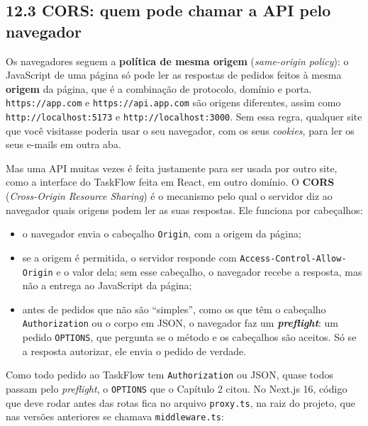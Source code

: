 \subsection{12.3 CORS: quem pode chamar a API pelo navegador}

Os navegadores seguem a \textbf{política de mesma origem} (\textit{same-origin policy}): o JavaScript de uma página só pode ler as respostas de pedidos feitos à mesma \textbf{origem} da página, que é a combinação de protocolo, domínio e porta. \texttt{https://app.com} e \texttt{https://api.app.com} são origens diferentes, assim como \texttt{http://localhost:5173} e \texttt{http://localhost:3000}. Sem essa regra, qualquer site que você visitasse poderia usar o seu navegador, com os seus \textit{cookies}, para ler os seus e-mails em outra aba.

Mas uma API muitas vezes é feita justamente para ser usada por outro site, como a interface do TaskFlow feita em React, em outro domínio. O \textbf{CORS} (\textit{Cross-Origin Resource Sharing}) é o mecanismo pelo qual o servidor diz ao navegador quais origens podem ler as suas respostas. Ele funciona por cabeçalhos:

\begin{itemize}
  \item o navegador envia o cabeçalho \texttt{Origin}, com a origem da página;
  \item se a origem é permitida, o servidor responde com \texttt{Access-Control-Allow-Origin} e o valor dela; sem esse cabeçalho, o navegador recebe a resposta, mas não a entrega ao JavaScript da página;
  \item antes de pedidos que não são ``simples'', como os que têm o cabeçalho \texttt{Authorization} ou o corpo em JSON, o navegador faz um \textbf{\textit{preflight}}: um pedido \texttt{OPTIONS}, que pergunta se o método e os cabeçalhos são aceitos. Só se a resposta autorizar, ele envia o pedido de verdade.
\end{itemize}

Como todo pedido ao TaskFlow tem \texttt{Authorization} ou JSON, quase todos passam pelo \textit{preflight}, o \texttt{OPTIONS} que o Capítulo 2 citou. No Next.js 16, código que deve rodar antes das rotas fica no arquivo \texttt{proxy.ts}, na raiz do projeto, que nas versões anteriores se chamava \texttt{middleware.ts}:

